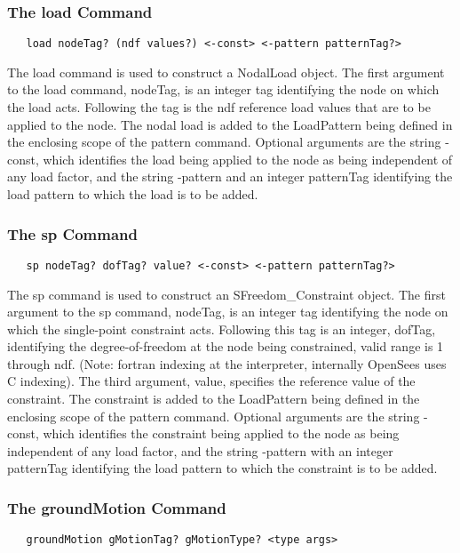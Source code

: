 \documentclass[12pt]{article}
\begin{document}
\subsubsection{The load Command}
{\sf\small
\begin{verbatim}
   load nodeTag? (ndf values?) <-const> <-pattern patternTag?>
\end{verbatim}
}

The load command is used to construct a NodalLoad object. The first
argument to the load command, nodeTag, is an integer tag identifying the
node on which the load acts. Following the tag is the ndf reference
load values that are to be applied to the node. The nodal load is
added to the LoadPattern being defined in the enclosing scope of the
pattern command. Optional arguments are the string -const, which
identifies the load being applied to the node as being independent of
any load factor, and the string -pattern and an integer patternTag
identifying the load pattern to which the load is to be added.

\subsubsection{The sp Command}
{\sf\small
\begin{verbatim}
   sp nodeTag? dofTag? value? <-const> <-pattern patternTag?>
\end{verbatim}
}

The sp command is used to construct an SFreedom\_Constraint object. The first
argument to the sp command, nodeTag, is an integer tag identifying the
node on which the single-point constraint acts. Following this tag is 
an integer, dofTag, identifying the degree-of-freedom at the node being
constrained, valid range is 1 through ndf. (Note: fortran indexing at
the interpreter, internally OpenSees uses C indexing). The third argument,
value, specifies the reference value of the constraint. The constraint is
added to the LoadPattern being defined in the enclosing scope of the
pattern command. Optional arguments are the string -const, which
identifies the constraint being applied to the node as being independent of
any load factor, and the string -pattern with an integer patternTag
identifying the load pattern to which the constraint is to be added.


\subsubsection{The groundMotion Command}
{\sf\small
\begin{verbatim}
   groundMotion gMotionTag? gMotionType? <type args>
\end{verbatim}
}
\end{document}

